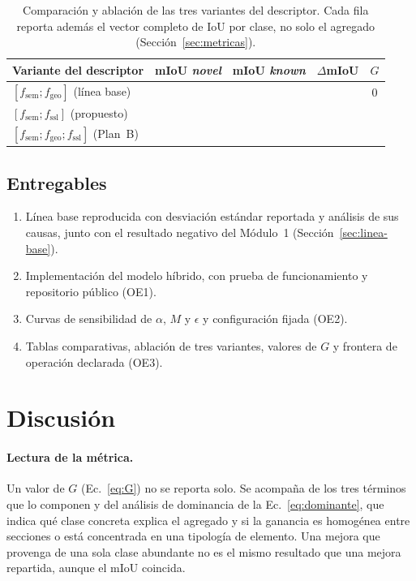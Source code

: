 \begin{table}[H]
\centering
\caption{Comparación y ablación de las tres variantes del descriptor. Cada fila
reporta además el vector completo de IoU por clase, no solo el agregado
(Sección~\ref{sec:metricas}).}
\label{tab:comparativa}
\begin{tabular}{@{}lcccc@{}}
\toprule
\textbf{Variante del descriptor} & \textbf{mIoU \emph{novel}} & \textbf{mIoU \emph{known}} & $\Delta$\textbf{mIoU} & $G$ \\
\midrule
$[f_{\mathrm{sem}};f_{\mathrm{geo}}]$ (línea base) & & & & 0 \\
$[f_{\mathrm{sem}};f_{\mathrm{ssl}}]$ (propuesto) & & & & \\
$[f_{\mathrm{sem}};f_{\mathrm{geo}};f_{\mathrm{ssl}}]$ (Plan~B) & & & & \\
\bottomrule
\end{tabular}
\end{table}

\subsection{Entregables}

\begin{enumerate}
\item Línea base reproducida con desviación estándar reportada y análisis de sus
causas, junto con el resultado negativo del Módulo~1
(Sección~\ref{sec:linea-base}).
\item Implementación del modelo híbrido, con prueba de funcionamiento y
repositorio público (OE1).
\item Curvas de sensibilidad de $\alpha$, $M$ y $\epsilon$ y configuración fijada
(OE2).
\item Tablas comparativas, ablación de tres variantes, valores de $G$ y frontera
de operación declarada (OE3).
\end{enumerate}

\section{Discusión}

\paragraph*{Lectura de la métrica.} Un valor de $G$ (Ec.~\eqref{eq:G}) no se
reporta solo. Se acompaña de los tres términos que lo componen y del análisis de
dominancia de la Ec.~\eqref{eq:dominante}, que indica qué clase concreta explica el agregado
y si la ganancia es homogénea entre secciones o está concentrada en una tipología
de elemento. Una mejora que provenga de una sola clase abundante no es el mismo
resultado que una mejora repartida, aunque el mIoU coincida.

